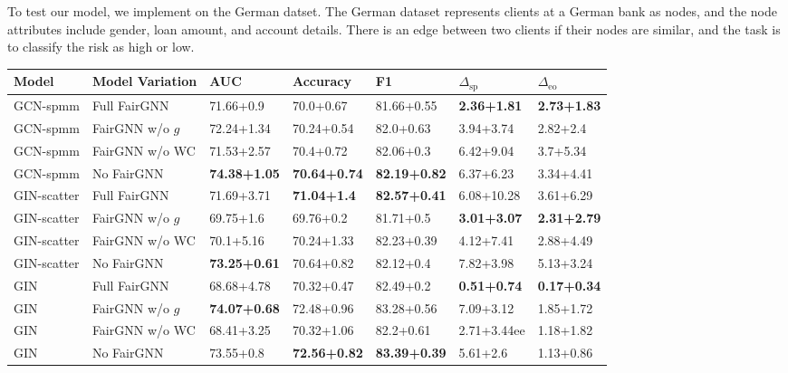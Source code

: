 \documentclass[final]{article}
\begin{document}
To test our model, we implement on the German datset. The German dataset represents clients at a German bank as nodes, and the node attributes include gender, loan amount, and account details. There is an edge between two clients if their nodes are similar, and the task is to classify the risk as high or low. 

\begin{table}[b]
\small
\begin{tabular}{|
>{\columncolor[HTML]{D4D4D4}}l |l|l|l|l|l|l|}
\hline
\cellcolor[HTML]{B0B3B2}Model & \cellcolor[HTML]{B0B3B2}Model Variation & \cellcolor[HTML]{B0B3B2}AUC & \cellcolor[HTML]{B0B3B2}Accuracy & \cellcolor[HTML]{B0B3B2}F1 & \cellcolor[HTML]{B0B3B2}$\Delta_{\text{sp}}$ & \cellcolor[HTML]{B0B3B2}$\Delta_{\text{eo}}$ \\ \hline 
GCN-spmm & Full FairGNN &71.66+0.9 & 70.0+0.67 & 81.66+0.55 & \textbf{2.36+1.81} & \textbf{2.73+1.83} \\ \hline
GCN-spmm & FairGNN w/o $g$  & 72.24+1.34 & 70.24+0.54 & 82.0+0.63 & 3.94+3.74 & 2.82+2.4 \\ \hline
GCN-spmm & FairGNN w/o WC & 71.53+2.57 & 70.4+0.72 & 82.06+0.3 & 6.42+9.04 & 3.7+5.34 \\ \hline
GCN-spmm & No FairGNN & \textbf{74.38+1.05} & \textbf{70.64+0.74} & \textbf{82.19+0.82} & 6.37+6.23 & 3.34+4.41 \\ \hline \hline 
GIN-scatter & Full FairGNN &71.69+3.71 & \textbf{71.04+1.4} & \textbf{82.57+0.41} & 6.08+10.28 & 3.61+6.29 \\ \hline
GIN-scatter & FairGNN w/o $g$&69.75+1.6 & 69.76+0.2 & 81.71+0.5 & \textbf{3.01+3.07} & \textbf{2.31+2.79} \\ \hline
GIN-scatter  &FairGNN w/o WC &70.1+5.16 & 70.24+1.33 & 82.23+0.39 & 4.12+7.41 & 2.88+4.49 \\ \hline
GIN-scatter & No FairGNN & \textbf{73.25+0.61} & 70.64+0.82 & 82.12+0.4 & 7.82+3.98 & 5.13+3.24 \\ \hline \hline 
GIN & Full FairGNN&68.68+4.78 & 70.32+0.47 & 82.49+0.2 & \textbf{0.51+0.74} & \textbf{0.17+0.34} \\ \hline
GIN  & FairGNN w/o $g$&\textbf{74.07+0.68} & 72.48+0.96 & 83.28+0.56 & 7.09+3.12 & 1.85+1.72 \\ \hline
GIN  &FairGNN w/o WC &68.41+3.25 & 70.32+1.06 & 82.2+0.61 & 2.71+3.44ee & 1.18+1.82 \\ \hline
GIN  &No FairGNN & 73.55+0.8 & \textbf{72.56+0.82} & \textbf{83.39+0.39} & 5.61+2.6 & 1.13+0.86 \\ \hline \hline 

\end{tabular}
\end{table}
\end{document}
